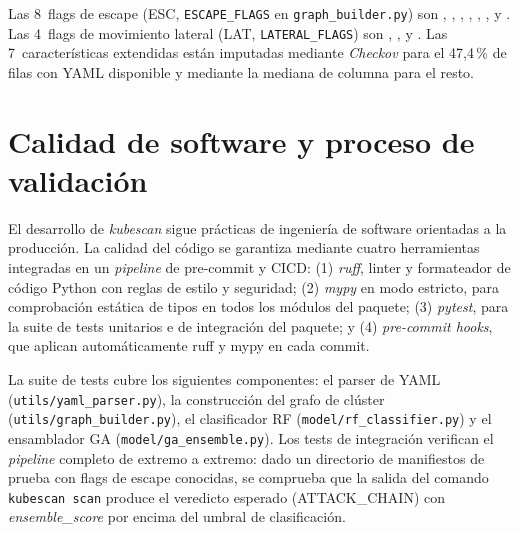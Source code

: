 Las 8~flags de escape (ESC, \texttt{ESCAPE\_FLAGS} en \texttt{graph\_builder.py}) son
, , ,
, , ,
 y . Las 4~flags de movimiento
lateral (LAT, \texttt{LATERAL\_FLAGS}) son ,
,  y .
Las 7~características extendidas están imputadas mediante \textit{Checkov} para el
47,4\,\% de filas con YAML disponible y mediante la mediana de columna para el resto.

\section{Calidad de software y proceso de validación}
\label{sec:calidad}

El desarrollo de \textit{kubescan} sigue prácticas de ingeniería de software
orientadas a la producción. La calidad del código se garantiza mediante cuatro
herramientas integradas en un \textit{pipeline} de pre-commit y \acs{CICD}: (1)
\textit{ruff}, linter y formateador de código Python con reglas de estilo y
seguridad; (2) \textit{mypy} en modo estricto, para comprobación estática de
tipos en todos los módulos del paquete; (3) \textit{pytest}, para la suite de
tests unitarios e de integración del paquete; y (4) \textit{pre-commit hooks},
que aplican automáticamente ruff y mypy en cada commit.

{\raggedright
La suite de tests cubre los siguientes componentes: el parser de \acs{YAML}
(\texttt{utils/yaml\_parser.py}), la construcción del grafo de clúster
(\texttt{utils/graph\_builder.py}), el clasificador \ac{RF} (\texttt{model/rf\_classifier.py})
y el ensamblador \ac{GA} (\texttt{model/ga\_ensemble.py}). Los tests de integración
verifican el \textit{pipeline} completo de extremo a extremo: dado un directorio
de manifiestos de prueba con flags de escape conocidas, se comprueba que la salida
del comando \texttt{kubescan scan} produce el veredicto esperado (ATTACK\_CHAIN)
con \textit{ensemble\_score} por encima del umbral de clasificación.\par}
